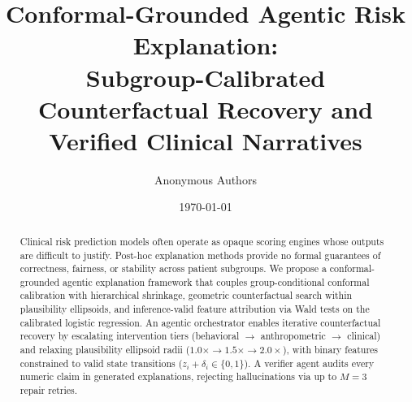 \documentclass[11pt,a4paper]{article}
\title{Conformal-Grounded Agentic Risk Explanation:\\
Subgroup-Calibrated Counterfactual Recovery and Verified Clinical Narratives}
\author{Anonymous Authors}
\date{\today}
\theoremstyle{plain}
\begin{document}
\maketitle

\begin{abstract}
Clinical risk prediction models often operate as opaque scoring engines whose outputs are difficult to justify. Post-hoc explanation methods provide no formal guarantees of correctness, fairness, or stability across patient subgroups. We propose a conformal-grounded agentic explanation framework that couples group-conditional conformal calibration with hierarchical shrinkage, geometric counterfactual search within plausibility ellipsoids, and inference-valid feature attribution via Wald tests on the calibrated logistic regression. An agentic orchestrator enables iterative counterfactual recovery by escalating intervention tiers (behavioral $\to$ anthropometric $\to$ clinical) and relaxing plausibility ellipsoid radii ($1.0\times \to 1.5\times \to 2.0\times$), with binary features constrained to valid state transitions ($z_i + \delta_i \in \{0,1\}$). A verifier agent audits every numeric claim in generated explanations, rejecting hallucinations via up to $M=3$ repair retries.


\end{abstract}
\end{document}
